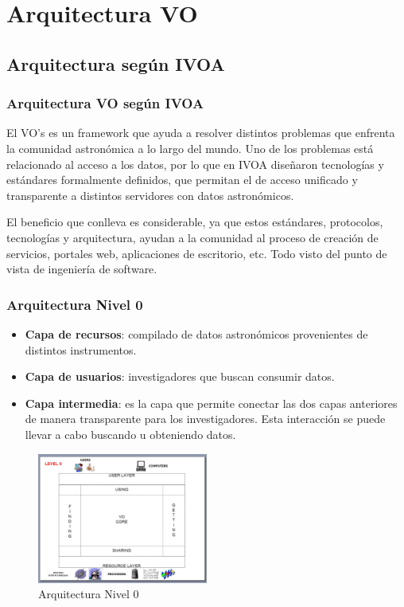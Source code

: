 \section{Arquitectura VO}

\subsection{Arquitectura según IVOA}

\begin{frame}
\frametitle{Arquitectura VO según IVOA}
El VO's es un framework que ayuda a resolver distintos
problemas que enfrenta la comunidad astronómica a lo largo del mundo.  Uno de
los problemas está relacionado al acceso a los datos, por lo que en IVOA
diseñaron tecnologías y estándares formalmente definidos, que permitan el de
acceso unificado y transparente a distintos servidores con datos astronómicos.

El beneficio que conlleva es considerable, ya que estos
estándares, protocolos, tecnologías y arquitectura, ayudan a la comunidad al
proceso de creación de servicios, portales web, aplicaciones de escritorio,
etc. Todo visto del punto de vista de ingeniería de software.
\end{frame}

\begin{frame}
\frametitle{Arquitectura Nivel 0}
\begin{multicols}{2}
\begin{itemize}
    \item \textbf{Capa de recursos}:
          compilado de datos astronómicos provenientes de distintos instrumentos.
    \item \textbf{Capa de usuarios}:
          investigadores que buscan consumir datos.
    \item \textbf{Capa intermedia}:
          es la capa que permite conectar las dos
          capas anteriores de manera transparente para los investigadores.
          Esta interacción se puede llevar a cabo buscando u obteniendo datos.
\end{itemize}

\begin{figure}[h!t]
    \centering
    \includegraphics[width=0.5\textwidth]{img/arquitectura_0.png}
    \caption{Arquitectura Nivel 0}
    \label{fig:nivel0}
\end{figure}

\end{multicols}
\end{frame}


